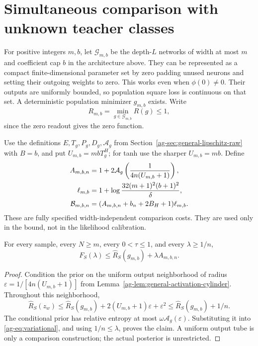 \section{Simultaneous comparison with unknown teacher classes}
\label{ag-sec:population-oracle}
For positive integers $m,b$, let $\mathcal G_{m,b}$ be the depth-$L$ networks of width at most $m$ and coefficient cap $b$ in the architecture above. They can be represented as a compact finite-dimensional parameter set by zero padding unused neurons and setting their outgoing weights to zero. This works even when $\phi(0)\ne0$. Their outputs are uniformly bounded, so population square loss is continuous on that set. A deterministic population minimizer $g_{m,b}$ exists. Write
\[
 R_{m,b}=\min_{g\in\mathcal G_{m,b}}R(g)\le1,
\]
since the zero readout gives the zero function.

Use the definitions $E,T_g,P_g,D_g,\mathcal A_g$ from Section~\ref{ag-sec:general-lipschitz-raw} with $B=b$, and put $U_{m,b}=mbT_g^H$; for tanh use the sharper $U_{m,b}=mb$. Define
\begin{align}
 A_{m,b,n}&=1+2\mathcal A_g\left(\frac1{4n(U_{m,b}+1)}\right),\notag\\
 \ell_{m,b}&=1+\log\frac{32(m+1)^2(b+1)^2}{\delta},\notag\\
 \mathcal B_{m,b,n}&=(A_{m,b,n}+b_n+2B_H+1)\ell_{m,b}.
 \label{ag-eq:comparison-cost}
\end{align}
These are fully specified width-independent comparison costs. They are used only in the bound, not in the likelihood calibration.

\begin{lemma}
\label{ag-lem:teacher-comparison}
For every sample, every $N\ge m$, every $0<\tau\le1$, and every $\lambda\ge1/n$,
\begin{equation}
 F_S(\lambda)\le\widehat R_S(g_{m,b})+\lambda A_{m,b,n}.
 \label{ag-eq:teacher-comparison}
\end{equation}
\end{lemma}
\begin{proof}
Condition the prior on the uniform output neighborhood of radius
$\varepsilon=1/[4n(U_{m,b}+1)]$ from Lemma~\ref{ag-lem:general-activation-cylinder}. Throughout this neighborhood,
\[
 \widehat R_S(z_w)\le\widehat R_S(g_{m,b})
                      +2(U_{m,b}+1)\varepsilon+\varepsilon^2
 \le\widehat R_S(g_{m,b})+1/n.
\]
The conditional prior has relative entropy at most $\omega\mathcal A_g(\varepsilon)$. Substituting it into \eqref{ag-eq:variational}, and using $1/n\le\lambda$, proves the claim. A uniform output tube is only a comparison construction; the actual posterior is unrestricted.
\end{proof}

